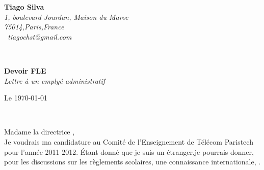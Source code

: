 \documentclass[11pt]{article}
\newcommand{\red}[1]{{\color{red}{#1}}}
\begin{document}
\hfill%
\begin{minipage}[t]{.6\textwidth}
\raggedleft%
{\bfseries Tiago Silva}\\[.35ex]
\small\itshape%
1, boulevard Jourdan, Maison du Maroc\\
75014,Paris,France\\[.35ex]
\Letter~tiagochst@gmail.com
\end{minipage}\\[1em]
%
\begin{minipage}[t]{.4\textwidth}
\raggedright%
{\bfseries Devoir FLE}\\[.35ex]
\small\itshape%
Lettre à un emplyé administratif\\
\end{minipage}
\hfill %
\begin{minipage}[t]{.4\textwidth}
\raggedleft %
Le \today
\end{minipage}\\[2em]
\raggedright


%



Madame la directrice ,\\[1.5em]
%


%



Je voudrais  \red{poser} ma candidature  au Comité de l'Enseignement  de Télécom
Paristech  pour  l’année 2011-2012.  Étant  donné  que  je suis  un  étranger,je
pourrais  donner,  pour  les  discussions  sur  les  règlements  scolaires,  une
connaissance internationale, \red{qui l'enrichirait}.
\end{document}
